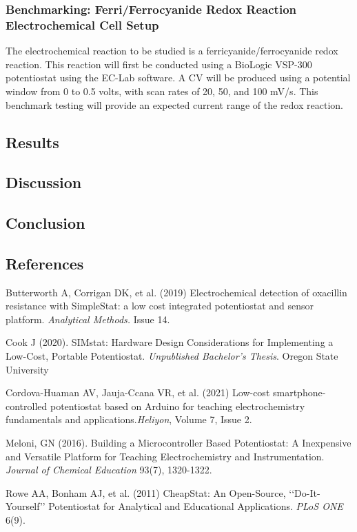 \documentclass{article}
\begin{document}
\subsubsection*{Benchmarking: Ferri/Ferrocyanide Redox Reaction Electrochemical Cell Setup}

The electrochemical reaction to be studied is a ferricyanide/ferrocyanide redox reaction. This reaction will first be conducted using a BioLogic VSP-300 potentiostat using the EC-Lab software. A CV will be produced using a potential window from 0 to 0.5 volts, with scan rates of 20, 50, and 100 mV/s. This benchmark testing will provide an expected current range of the redox reaction. 

\subsection*{Results}

\subsection*{Discussion}
\subsection*{Conclusion}

\subsection*{References}
Butterworth A, Corrigan DK, et al. (2019) Electrochemical detection of oxacillin resistance with SimpleStat: a low cost integrated potentiostat and sensor platform. \emph{Analytical Methods.} Issue 14. 

Cook J (2020). SIMstat: Hardware Design Considerations for Implementing a Low-Cost, Portable Potentiostat. \emph{Unpublished Bachelor's Thesis}. Oregon State University

Cordova-Huaman AV, Jauja-Ccana VR, et al. (2021) Low-cost smartphone-controlled potentiostat based on Arduino for teaching electrochemistry fundamentals and applications.\emph{Heliyon}, Volume 7, Issue 2. 

Meloni, GN (2016). Building a Microcontroller Based Potentiostat: A Inexpensive and Versatile Platform for Teaching Electrochemistry and Instrumentation. \emph{Journal of Chemical Education} 93(7), 1320-1322. 

Rowe AA, Bonham AJ, et al. (2011) CheapStat: An Open-Source, ‘‘Do-It-Yourself’’ Potentiostat for Analytical and Educational Applications. \emph{PLoS ONE} 6(9).
\end{document}

